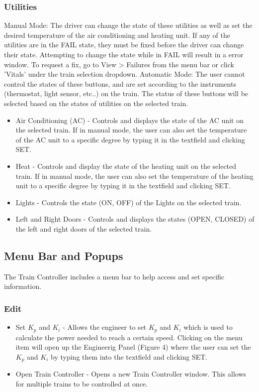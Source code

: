 \documentclass[letterpaper]{article}
\begin{document}
	\subsubsection{Utilities}
	Manual Mode: The driver can change the state of these utilities as well as set the desired temperature of the air conditioning and heating unit. If any of the utilities are in the FAIL state, they must be fixed before the driver can change their state. Attempting to change the state while in FAIL will result in a error window. To request a fix, go to View > Failures from the menu bar or click 'Vitals' under the train selection dropdown.
	\newline
	Automatic Mode: The user cannot control the states of these buttons, and are set according to the instruments (thermostat, light sensor, etc..) on the train. The status of these buttons will be selected based on the states of utilities on the selected train.
		\begin{itemize}
			\item Air Conditioning (AC) - Controls and displays the state of the AC unit on the selected train. If in manual mode, the user can also set the temperature of the AC unit to a specific degree by typing it in the textfield and clicking SET. 
			\item Heat - Controls and display the state of the heating unit on the selected train. If in manual mode, the user can also set the temperature of the heating unit to a specific degree by typing it in the textfield and clicking SET.
			\item Lights - Controls the state (ON, OFF) of the Lights on the selected train. 
			\item Left and Right Doors - Controls and displays the states (OPEN, CLOSED) of the left and right doors of the selected train.  
		\end{itemize}
	
\subsection{Menu Bar and Popups}

The Train Controller includes a menu bar to help access and set specific information.  

\subsubsection{Edit}
	\begin{itemize}
		\item Set $K_{p}$ and $K_{i}$ - Allows the engineer to set $K_{p}$ and $K_{i}$ which is used to calculate the power needed to reach a certain speed. Clicking on the menu item will open up the Engineerig Panel (Figure 4) where the user can set the $K_{p}$ and $K_{i}$ by typing them into the textfield and clicking SET.
		\item Open Train Controller - Opens a new Train Controller window. This allows for multiple trains to be controlled at once. 
	\end{itemize}
\end{document}
